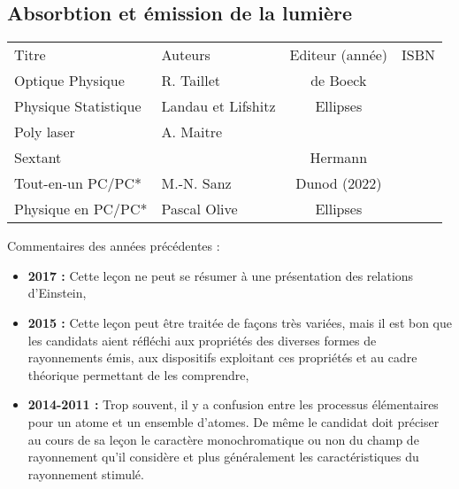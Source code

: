 \begin{headerBlock}
  \chapter{Absorbtion et émission de la lumière}
    \label{LP_Absorption}
\end{headerBlock}

\begin{center}
\begin{tabularx}{\textwidth}{| X | X | c | c |}
  \hline
  \rowcolor{gray!20}\multicolumn{4}{c}{Bibliographie de la leçon : } \\
  \hline 
  Titre & Auteurs & Editeur (année) & ISBN \\
  \hline
  Optique Physique & R. Taillet & de Boeck &   \\
  \hline 
  Physique Statistique & Landau et Lifshitz & Ellipses &  \\
  \hline 
   Poly laser & A. Maitre &  &  \\
\hline
 Sextant & & Hermann & \\
 \hline 
 Tout-en-un PC/PC* & M.-N. Sanz & Dunod (2022) & \\
 \hline 
 Physique en PC/PC* & Pascal Olive & Ellipses & \\
 \hline
\end{tabularx}
\end{center}

\begin{reportBlock}{Commentaires des années précédentes :}
    \begin{itemize}
        \item \textbf{2017 :} Cette leçon ne peut se résumer à une présentation des relations d’Einstein,
        \item \textbf{2015 :} Cette leçon peut être traitée de façons très variées, mais il est bon que les candidats aient réfléchi aux propriétés des diverses formes de rayonnements émis, aux dispositifs exploitant ces propriétés et au cadre théorique permettant de les comprendre,
        \item \textbf{2014-2011 : }Trop souvent, il y a confusion entre les processus élémentaires pour un atome et un ensemble d’atomes. De même le candidat doit préciser au cours de sa leçon le caractère monochromatique ou non du champ de rayonnement qu’il considère et plus généralement les caractéristiques du rayonnement stimulé.
    \end{itemize}
\end{reportBlock}

